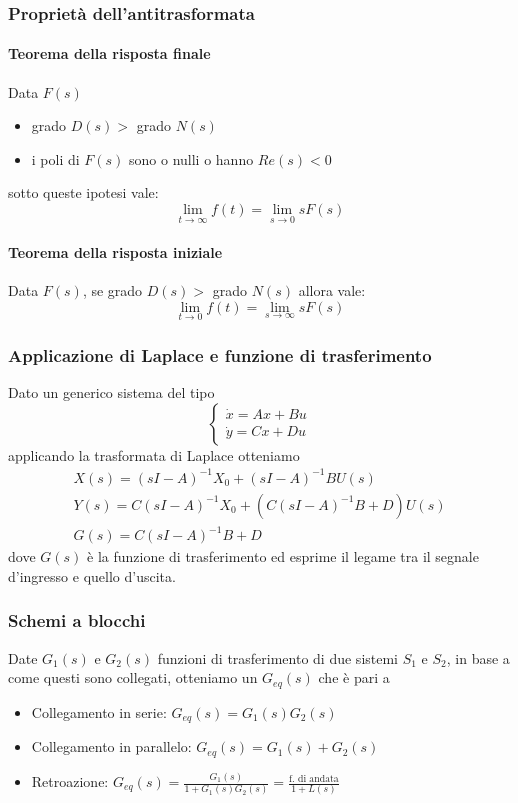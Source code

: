 \documentclass{article}
\begin{document}
	\subsubsection{Proprietà dell'antitrasformata}
	\paragraph{Teorema della risposta finale}
	Data $F(s)$
	\begin{itemize}
		\item grado $D(s) >$ grado $N(s)$
		\item i poli di $F(s)$ sono o nulli o hanno $Re(s) < 0$
	\end{itemize}
	sotto queste ipotesi vale:
	\begin{equation}
		\lim_{t\to\infty} f(t) = \lim_{s\to 0} sF(s)
	\end{equation}
	\paragraph{Teorema della risposta iniziale}
	Data $F(s)$, se grado $D(s) >$ grado $N(s)$ allora vale:
	\begin{equation}
	\lim_{t\to 0} f(t) = \lim_{s\to\infty} sF(s)
	\end{equation}
	\subsubsection{Applicazione di Laplace e funzione di trasferimento}
	Dato un generico sistema del tipo
	\begin{equation}
		\begin{cases}
			\dot{x} = Ax + Bu\\
			\dot{y} = Cx + Du
		\end{cases}
	\end{equation}
	applicando la trasformata di Laplace otteniamo
	\begin{align}		
		X(s) = (sI-A)^{-1}X_0 + (sI-A)^{-1}BU(s) \\
		Y(s) = C(sI-A)^{-1}X_0 + (C(sI-A)^{-1}B+D)U(s) \\
		G(s) = C(sI-A)^{-1}B+D		
	\end{align}
	dove $G(s)$ è la funzione di trasferimento ed esprime il legame tra il segnale d'ingresso e quello d'uscita.
	\subsubsection{Schemi a blocchi}
	Date $G_1(s)$ e $G_2(s)$ funzioni di trasferimento di due sistemi $S_1$ e $S_2$, in base a come questi sono collegati, otteniamo un $G_{eq}(s)$ che è pari a
	\begin{itemize}
		\item Collegamento in serie: $G_{eq}(s) = G_1(s)G_2(s)$
		\item Collegamento in parallelo: $G_{eq}(s) = G_1(s) + G_2(s)$
		\item Retroazione: $G_{eq}(s) = \frac{G_1(s)}{1 + G_1(s)G_2(s)} = \frac{\mbox{f. di andata}}{1 + L(s)}$
	\end{itemize}
\end{document}
